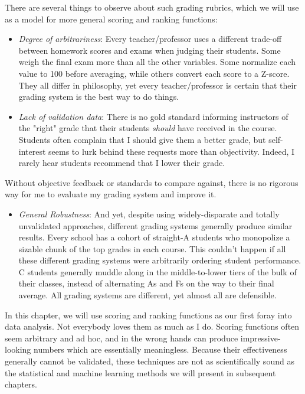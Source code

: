 \documentclass[10pt]{article}
\begin{document}
There are several things to observe about such grading rubrics, which we will use as a model for more general scoring and ranking functions:

\begin{itemize}
  \item \textit{Degree of arbitrariness}: Every teacher/professor uses a different trade-off between homework scores and exams when judging their students. Some weigh the final exam more than all the other variables. Some normalize each value to 100 before averaging, while others convert each score to a Z-score. They all differ in philosophy, yet every teacher/professor is certain that their grading system is the best way to do things.
  \item \textit{Lack of validation data}: There is no gold standard informing instructors of the "right" grade that their students \textit{should} have received in the course. Students often complain that I should give them a better grade, but self-interest seems to lurk behind these requests more than objectivity. Indeed, I rarely hear students recommend that I lower their grade.
\end{itemize}

Without objective feedback or standards to compare against, there is no rigorous way for me to evaluate my grading system and improve it.

\begin{itemize}
  \item \textit{General Robustness}: And yet, despite using widely-disparate and totally unvalidated approaches, different grading systems generally produce similar results. Every school has a cohort of straight-A students who monopolize a sizable chunk of the top grades in each course. This couldn't happen if all these different grading systems were arbitrarily ordering student performance. C students generally muddle along in the middle-to-lower tiers of the bulk of their classes, instead of alternating As and Fs on the way to their final average. All grading systems are different, yet almost all are defensible.
\end{itemize}

In this chapter, we will use scoring and ranking functions as our first foray into data analysis. Not everybody loves them as much as I do. Scoring functions often seem arbitrary and ad hoc, and in the wrong hands can produce impressive-looking numbers which are essentially meaningless. Because their effectiveness generally cannot be validated, these techniques are not as scientifically sound as the statistical and machine learning methods we will present in subsequent chapters.
\end{document}
